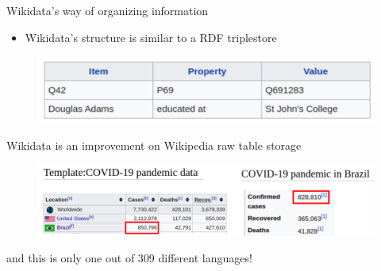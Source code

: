\documentclass{beamer}
\begin{document}



\begin{frame}{Wikidata's way of organizing information}

\begin{itemize}
    \item Wikidata's structure is similar to a RDF triplestore
\end{itemize}
\begin{figure}
\includegraphics[scale=0.45]{fig/item_property_value.png}
\end{figure}

\end{frame}


\begin{frame}{Wikidata is an improvement on Wikipedia raw table storage}

\begin{figure}
\includegraphics[scale=0.45]{fig/template_covid_19_brasil.png}
\end{figure}
and this is only one out of 309 different languages!
\end{frame}
\end{document}
